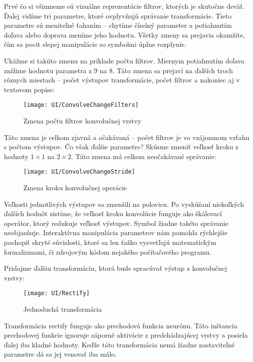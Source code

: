 Prvé čo si všimneme sú vizuálne reprezentácie filtrov, ktorých je skutočne deväť. Ďalej vidíme tri parametre, ktoré ovplyvňujú správanie transformácie. Tieto parametre sú meniteľné ťahaním -- chytíme číselný parameter a potiahnutím doľava alebo doprava meníme jeho hodnotu. Všetky zmeny sa prejavia okamžite, čím sa pocit slepej manipulácie so symbolmi úplne rozplynie.

\bigskip

Ukážme si takúto zmenu na príklade počtu filtrov. Miernym potiahnutím doľava znížime hodnotu parametra z 9 na 8. Táto zmena sa prejaví na ďalších troch rôznych miestach -- počet výstupov transformácie, počet filtrov a nakoniec aj v textovom popise:

\begin{figure}[H]
  \centering
  \texttt{[image: UI/ConvolveChangeFilters]}
  \caption{Zmena počtu filtrov konvolučnej vrstvy}
\end{figure}

Táto zmena je celkom zjavná a očakávaná -- počet filtrov je vo vzájomnom vzťahu s počtom výstupov. Čo však ďalšie parametre? Skúsme zmeniť veľkosť kroku z hodnoty $1 \times 1$ na $2 \times 2$. Táto zmena má celkom neočakávané správanie:

\begin{figure}[H]
  \centering
  \texttt{[image: UI/ConvolveChangeStride]}
  \caption{Zmena kroku konvolučnej operácie}
\end{figure}

Veľkosti jednotlivých výstupov sa zmenšili na polovicu. Po vyskúšaní niekoľkých ďalších hodnôt zistíme, že veľkosť kroku konvolúcie funguje ako škálovací operátor, ktorý redukuje veľkosť výstupov. Symbol  žiadne takéto správanie neobjasňuje. Interaktívna manipulácia parametrov nám pomohla rýchlejšie pochopiť skryté súvislosti, ktoré sa len ťažko vysvetľujú matematickým formalizmami, či zdrojovým kódom nejakého počítačového programu.

\bigskip

Pridajme ďalšiu transformáciu, ktorá bude spracúvať výstup z konvolučnej vrstvy:

\begin{figure}[H]
  \centering
  \texttt{[image: UI/Rectify]}
  \caption{Jednoduchá transformácia}
\end{figure}

Transformácia rectify funguje ako prechodová funkcia neurónu. Táto inštancia prechodovej funkcie ignoruje záporné aktivácie z predchádzajúcej vrstvy a posiela ďalej iba kladné hodnoty. Keďže táto transformácia nemá žiadne nastaviteľné parametre dá sa jej venovať iba málo.

